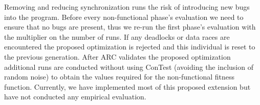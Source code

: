 Removing and reducing synchronization runs the risk of introducing new bugs
into the program. Before every non-functional phase's evaluation we need to
ensure that no bugs are present, thus we re-run the first phase's evaluation
with the multiplier on the number of runs. If any deadlocks or data races are
encountered the proposed optimization is rejected and this individual is reset
to the previous generation. After ARC validates the proposed optimization
additional runs are conducted without using ConTest (avoiding the inclusion of
random noise) to obtain the values required for the non-functional fitness
function. Currently, we have implemented most of this proposed extension but have not conducted any empirical evaluation.
